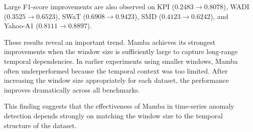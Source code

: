 \documentclass[runningheads]{llncs}
\begin{document}
Large F1-score improvements are also observed on KPI ($0.2483 \rightarrow 0.8078$), WADI ($0.3525 \rightarrow 0.6523$), SWaT ($0.6908 \rightarrow 0.9423$), SMD ($0.4123 \rightarrow 0.6242$), and Yahoo-A1 ($0.8111 \rightarrow 0.8897$).

These results reveal an important trend. Mamba achieves its strongest improvements when the window size is sufficiently large to capture long-range temporal dependencies. In earlier experiments using smaller windows, Mamba often underperformed because the temporal context was too limited. After increasing the window size appropriately for each dataset, the performance improves dramatically across all benchmarks.

This finding suggests that the effectiveness of Mamba in time-series anomaly detection depends strongly on matching the window size to the temporal structure of the dataset.
\end{document}
